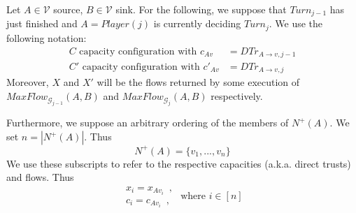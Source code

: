 Let $A \in \mathcal{V}$ source, $B \in \mathcal{V}$ sink. For the following, we suppose that $Turn_{j-1}$ has just finished
and $A = Player\left(j\right)$ is currently deciding $Turn_j$. We use the following notation:
\begin{align*}
   C \mbox{ capacity configuration with } c_{Av} &= DTr_{A \rightarrow v, j-1} \\
   C' \mbox{ capacity configuration with } c'_{Av} &= DTr_{A \rightarrow v, j}
\end{align*}
Moreover, $X$ and $X'$ will be the flows returned by some execution of
$MaxFlow_{\mathcal{G}_{j-1}}\left(A, B\right)$ and $MaxFlow_{\mathcal{G}_j}\left(A, B\right)$ respectively.

Furthermore, we suppose an arbitrary ordering of the members of $N^{+}\left(A\right)$. We set $n = |N^{+}\left(A\right)|$.
Thus
\begin{equation*}
   N^{+}\left(A\right) = \{v_1, ..., v_n\}
\end{equation*}
We use these subscripts to refer to the respective capacities (a.k.a. direct trusts) and flows. Thus
\begin{equation*}
   \begin{array}{l}
      x_i = x_{Av_i} \enspace, \\
      c_i = c_{Av_i} \enspace,
   \end{array}
   \mbox{ where } i \in [n]
\end{equation*}

